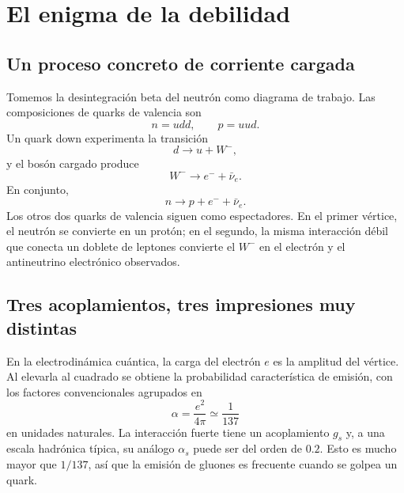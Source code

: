 \section{El enigma de la debilidad}

\subsection{Un proceso concreto de corriente cargada}

Tomemos la desintegración beta del neutrón como diagrama de trabajo. Las composiciones de quarks de valencia son
\begin{equation}
  n=udd,\qquad p=uud.
\end{equation}
Un quark down experimenta la transición
\begin{equation}
  d\longrightarrow u+W^-,
\end{equation}
y el bosón cargado produce
\begin{equation}
  W^-\longrightarrow e^-+\bar\nu_e.
\end{equation}
En conjunto,
\begin{equation}
  n\longrightarrow p+e^-+\bar\nu_e.
\end{equation}
Los otros dos quarks de valencia siguen como espectadores. En el primer vértice, el neutrón se convierte en un protón; en el segundo, la misma interacción débil que conecta un doblete de leptones convierte el \(W^-\) en el electrón y el antineutrino electrónico observados.

\subsection{Tres acoplamientos, tres impresiones muy distintas}

En la electrodinámica cuántica, la carga del electrón \(e\) es la amplitud del vértice. Al elevarla al cuadrado se obtiene la probabilidad característica de emisión, con los factores convencionales agrupados en
\begin{equation}
  \alpha=\frac{e^2}{4\pi}\simeq\frac1{137}
\end{equation}
en unidades naturales. La interacción fuerte tiene un acoplamiento \(g_s\) y, a una escala hadrónica típica, su análogo \(\alpha_s\) puede ser del orden de \(0.2\). Esto es mucho mayor que \(1/137\), así que la emisión de gluones es frecuente cuando se golpea un quark.

